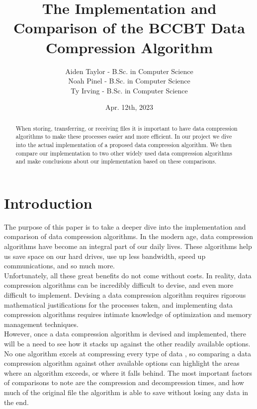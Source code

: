 \documentclass[12pt]{IEEEtran}
\newcommand{\Aiden}{Aiden Taylor - B.Sc. in Computer Science}
\newcommand{\Noah}{Noah Pinel - B.Sc. in Computer Science}
\newcommand{\Ty}{Ty Irving - B.Sc. in Computer Science}
\begin{document}
\title{The Implementation and Comparison of the BCCBT Data Compression Algorithm}
\author{
\begin{tabular}{l}
    \Aiden \\ \Noah\\ \Ty\\ 
\end{tabular}}
\date{Apr. 12th, 2023}

\maketitle

\begin{abstract}
When storing, transferring, or receiving files it is important to have data compression algorithms to make
these processes easier and more efficient. In our project we dive into the actual implementation
of a proposed data compression algorithm. We then compare our implementation to two other widely used 
data compression algorithms and make conclusions about our implementation based on these comparisons.
\end{abstract}

\section{Introduction}
The purpose of this paper is to take a deeper dive into the implementation and comparison of data compression
algorithms. In the modern age, data compression algorithms have become an integral part of our daily lives.
These algorithms help us save space on our hard drives, use up less bandwidth,
speed up communications, and so much more. \\

Unfortunately, all these great benefits do
not come without costs. In reality, data compression algorithms can be incredibly difficult to devise, and even
more difficult to implement. 
Devising a data compression algorithm requires rigorous mathematical justifications for the processes taken, and
implementing data compression algorithms requires intimate knowledge of optimization and memory management
techniques. \\

However, once a data compression algorithm is devised and implemented, there will be a need to see how it
stacks up against the other readily available options. No one algorithm excels at compressing every
type of data \cite{Sjostrand}, so comparing a data compression algorithm against other available options
can highlight the areas where an algorithm exceeds, or where it falls behind. The most important factors 
of comparisons to note are the compression and decompression times, and how much of the original file
the algorithm is able to save without losing any data in the end.\\
\end{document}
